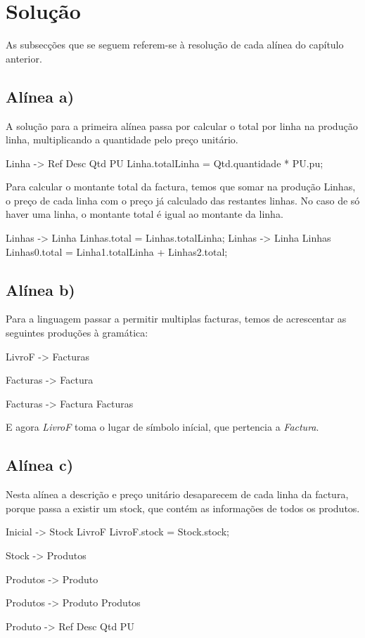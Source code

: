 \documentclass[11pt,a4paper]{article}
\begin{document}
\section{Solução}
As subsecções que se seguem referem-se à resolução de cada alínea do capítulo anterior.
\subsection{Alínea a)}
A solução para a primeira alínea passa por calcular o total por linha na produção linha, multiplicando a quantidade pelo preço unitário.

\begin{code_txt}
Linha -> Ref Desc Qtd PU {Linha.totalLinha = Qtd.quantidade * PU.pu;}
\end{code_txt}

Para calcular o montante total da factura, temos que somar na produção Linhas, o preço de cada linha com o preço já calculado das restantes linhas.
No caso de só haver uma linha, o montante total é igual ao montante da linha.

\begin{code_txt}
Linhas -> Linha {Linhas.total = Linhas.totalLinha;}
Linhas -> Linha Linhas {Linhas0.total = Linha1.totalLinha + Linhas2.total;}
\end{code_txt}

\subsection{Alínea b)}
Para a linguagem passar a permitir multiplas facturas, temos de acrescentar as seguintes produções à gramática:

\begin{code_txt}
LivroF -> Facturas

Facturas -> Factura

Facturas -> Factura Facturas
\end{code_txt}
 
E agora \textit{LivroF} toma o lugar de símbolo inícial, que pertencia a \textit{Factura}.
 
\subsection{Alínea c)}
Nesta alínea a descrição e preço unitário desaparecem de cada linha da factura, porque passa a existir um stock, que contém as informações de todos os produtos.

\begin{code_txt}
Inicial -> Stock LivroF { LivroF.stock = Stock.stock; }

Stock -> Produtos

Produtos -> Produto

Produtos -> Produto Produtos

Produto -> Ref Desc Qtd PU
\end{code_txt}
\end{document}
